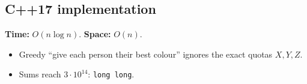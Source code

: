 
\subsection*{C++17 implementation}

\begin{complexitybox}
\textbf{Time:} $O(n\log n)$. \textbf{Space:} $O(n)$.
\end{complexitybox}

\begin{pitfallbox}
\begin{itemize}
  \item Greedy ``give each person their best colour'' ignores the exact
        quotas $X,Y,Z$.
  \item Sums reach $3\cdot10^{14}$: \texttt{long long}.
\end{itemize}
\end{pitfallbox}
